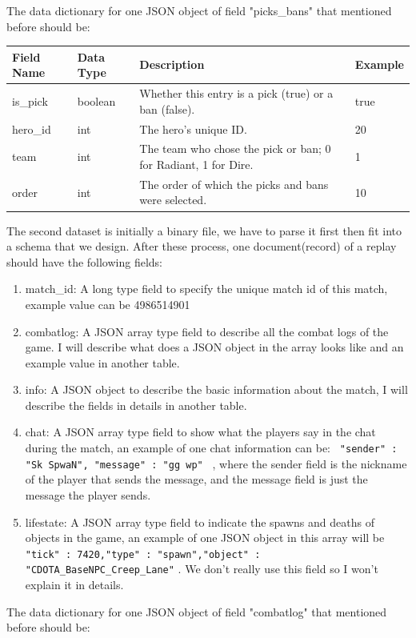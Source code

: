 \documentclass{article}
\newcommand{\codeinline}[1]{
    \texttt{#1}
}
\begin{document}
The data dictionary for one JSON object of field "picks\_bans" that mentioned before should be: \\
\begin{tabular}{|p{3cm}|p{2cm}|p{5cm}|p{3cm}|}
\hline
Field Name& Data Type& Description & Example\\
\hline
is\_pick & boolean & Whether this entry is a pick (true) or a ban (false). & true \\
\hline
hero\_id & int & The hero's unique ID. & 20 \\
\hline
team & int & The team who chose the pick or ban; 0 for Radiant, 1 for Dire. & 1 \\
\hline
order & int & The order of which the picks and bans were selected. & 10 \\
\hline
\end{tabular}

The second dataset is initially a binary file, we have to parse it first then fit into a schema that we design. After these process, one document(record) of a replay should have the following fields:
\begin{enumerate}
\item match\_id: A long type field to specify the unique match id of this match, example value can be 4986514901
\item combatlog: A JSON array type field to describe all the combat logs of the game. I will describe what does a JSON object in the array looks like and an example value in another table.
\item info: A JSON object to describe the basic information about the match, I will describe the fields in details in another table.
\item chat: A JSON array type field to show what the players say in the chat during the match, an example of one chat information can be: \codeinline{{ "sender" : "Sk SpwaN", "message" : "gg wp" }}, where the sender field is the nickname of the player that sends the message, and the message field is just the message the player sends.
\item lifestate: A JSON array type field to indicate the spawns and deaths of objects in the game, an example of one JSON object in this array will be \\
\codeinline{{"tick" : 7420,"type" : "spawn","object" : "CDOTA_BaseNPC_Creep_Lane"}}. We don't really use this field so I won't explain it in details.
\end{enumerate}

The data dictionary for one JSON object of field "combatlog" that mentioned before should be: \\
\end{document}

